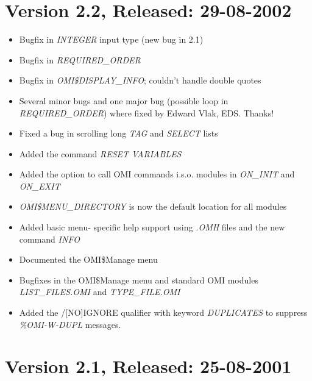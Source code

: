 \documentclass[a4paper]{book}
\begin{document}
\section*{Version 2.2, Released: 29-08-2002}

\begin{itemize}
\item Bugfix in \textsl{INTEGER} input type (new bug in 2.1)
\item Bugfix in \textsl{REQUIRED{\_}ORDER}
\item Bugfix in \textsl{OMI{\$}DISPLAY{\_}INFO}; couldn't handle double quotes
\item Several minor bugs and one major bug (possible loop in \textsl{REQUIRED{\_}ORDER}) where fixed by Edward Vlak, EDS. Thanks!
\item Fixed a bug in scrolling long \textsl{TAG} and \textsl{SELECT} lists
\item Added the command \textsl{RESET VARIABLES}
\item Added the option to call OMI commands i.s.o. modules in \textsl{ON{\_}INIT} and \textsl{ON{\_}EXIT}
\item \textsl{OMI{\$}MENU{\_}DIRECTORY} is now the default location for all modules
\item Added basic menu- specific help support using \textsl{.OMH} files and the new command \textsl{INFO}
\item Documented the OMI{\$}Manage menu
\item Bugfixes in the OMI{\$}Manage menu and standard OMI modules \textsl{LIST{\_}FILES.OMI} and \textsl{TYPE{\_}FILE.OMI}
\item Added the \textsf{/[NO]IGNORE} qualifier with keyword \textsl{DUPLICATES} to suppress \textsl{\%OMI-W-DUPL} messages.
\end{itemize}

\section*{Version 2.1, Released: 25-08-2001}
\end{document}
